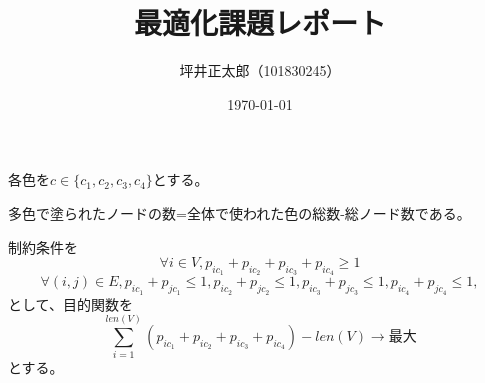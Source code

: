 \documentclass[a4paper,10pt]{jsarticle}
\begin{document}
\title{最適化課題レポート}
\author{坪井正太郎（101830245）}
\date{\today}
\maketitle
\section{}
各色を$c\in \{c_1,c_2,c_3,c_4\}$とする。

多色で塗られたノードの数=全体で使われた色の総数-総ノード数である。

制約条件を
\[\forall i \in V, p_{ic_1}+p_{ic_2}+p_{ic_3}+p_{ic_4}\geq  1\]
\[\forall (i,j)\in E, p_{ic_1}+p_{jc_1}\leq 1,p_{ic_2}+p_{jc_2}\leq 1,p_{ic_3}+p_{jc_3}\leq 1,p_{ic_4}+p_{jc_4}\leq 1,\]
として、目的関数を
\[\sum_{i = 1}^{len(V)} (p_{ic_1}+p_{ic_2}+p_{ic_3}+p_{ic_4})-len(V)\rightarrow 最大 \]
とする。
\end{document}
